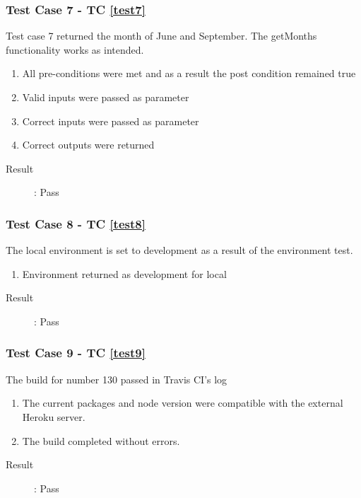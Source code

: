 \documentclass{article}
\begin{document}
\subsubsection{Test Case 7 - TC \ref{test7}}
Test case 7 returned the month of June and September. 
The getMonths functionality works as intended.
\begin{enumerate}
	\item All pre-conditions were met and as a result the post condition remained true
	\item Valid inputs were passed as parameter 
	\item Correct inputs were passed as parameter 
	\item Correct outputs were returned
\end{enumerate}

\begin{description}
	\item [Result]: Pass 
\end{description}

\subsubsection{Test Case 8 - TC \ref{test8}}
The local environment is set to development as a result of the environment test.
\begin{enumerate}
	\item Environment returned as development for local
\end{enumerate}

\begin{description}
	\item [Result]: Pass 
\end{description}

\subsubsection{Test Case 9 - TC \ref{test9}}
The build for number 130 passed in Travis CI's log
\begin{enumerate}
	\item The current packages and node version were compatible with the external Heroku server.
	\item The build completed without errors.
\end{enumerate}

\begin{description}
	\item [Result]: Pass 
\end{description}
\end{document}
